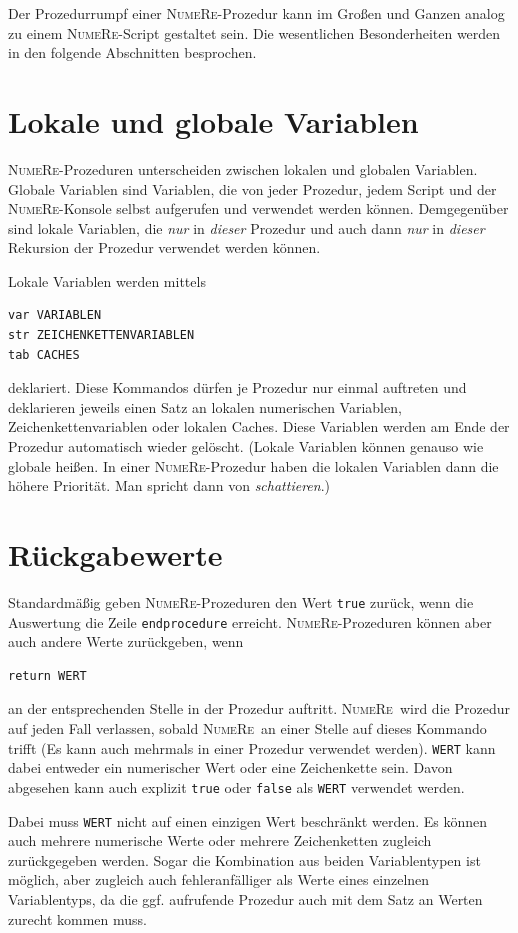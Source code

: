 \documentclass[DIV=14,headsepline,footsepline]{scrbook}
\newcommand{\NR}{\textsc{Nu\-me\-Re}}
\begin{document}
				Der Prozedurrumpf einer \NR-Prozedur kann im Großen und Ganzen analog zu einem \NR-Script gestaltet sein. Die wesentlichen Besonderheiten werden in den folgende Abschnitten besprochen.
			\section{Lokale und globale Variablen}
				\NR-Prozeduren unterscheiden zwischen lokalen und globalen Variablen. Globale Variablen sind Variablen, die von jeder Prozedur, jedem Script und der \NR-Konsole selbst aufgerufen und verwendet werden können. Demgegenüber sind lokale Variablen, die \emph{nur} in \emph{dieser} Prozedur und auch dann \emph{nur} in \emph{dieser} Rekursion der Prozedur verwendet werden können.
				
				Lokale Variablen werden mittels
				\begin{lstlisting}
var VARIABLEN
str ZEICHENKETTENVARIABLEN
tab CACHES
				\end{lstlisting}
				deklariert. Diese Kommandos dürfen je Prozedur nur einmal auftreten und deklarieren jeweils einen Satz an lokalen numerischen Variablen, Zeichenkettenvariablen oder lokalen Caches. Diese Variablen werden am Ende der Prozedur automatisch wieder gelöscht. (Lokale Variablen können genauso wie globale heißen. In einer \NR-Prozedur haben die lokalen Variablen dann die höhere Priorität. Man spricht dann von \emph{schattieren}.)
			\section{Rückgabewerte}
				Standardmäßig geben \NR-Prozeduren den Wert \verb+true+ zurück, wenn die Auswertung die Zeile \verb+endprocedure+ erreicht. \NR-Prozeduren können aber auch andere Werte zurückgeben, wenn
				\begin{lstlisting}
return WERT
				\end{lstlisting}
				an der entsprechenden Stelle in der Prozedur auftritt. \NR\ wird die Prozedur auf jeden Fall verlassen, sobald \NR\ an einer Stelle auf dieses Kommando trifft (Es kann auch mehrmals in einer Prozedur verwendet werden). \verb+WERT+ kann dabei entweder ein numerischer Wert oder eine Zeichenkette sein. Davon abgesehen kann auch explizit \verb+true+ oder \verb+false+ als \verb+WERT+ verwendet werden.
				
				Dabei muss \verb+WERT+ nicht auf einen einzigen Wert beschränkt werden. Es können auch mehrere numerische Werte oder mehrere Zeichenketten zugleich zurückgegeben werden. Sogar die Kombination aus beiden Variablentypen ist möglich, aber zugleich auch fehleranfälliger als Werte eines einzelnen Variablentyps, da die ggf. aufrufende Prozedur auch mit dem Satz an Werten zurecht kommen muss.
				
\end{document}
